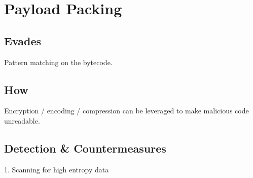 \section{Payload Packing}

\subsection{Evades}

Pattern matching on the bytecode.

\subsection{How}

Encryption / encoding / compression can be leveraged to make malicious code unreadable.

\subsection{Detection \& Countermeasures}

1. Scanning for high entropy data

